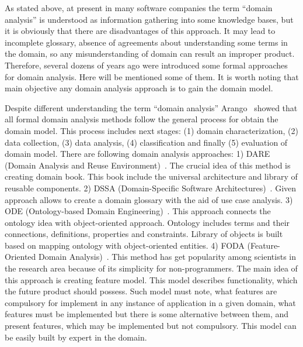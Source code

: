 \documentclass[conference]{IEEEtran}
\begin{document}
As stated above, at present in many software companies the term ``domain analysis'' is understood as information gathering into some knowledge bases, but it is obviously that there are disadvantages of this approach. It may lead to incomplete glossary, absence of agreements about understanding some terms in the domain, so any misunderstanding of domain can result an improper product. Therefore, several dozens of years ago were introduced some formal approaches for domain analysis. Here will be mentioned some of them. It is worth noting that main objective any domain analysis approach is to gain the domain model.  

Despite different understanding the term ``domain analysis'' Arango~\cite{arango1994domain} showed that all formal domain analysis methods follow the general process for obtain the domain model. This process includes next stages: (1) domain characterization, (2) data collection, (3) data analysis, (4) classification and finally (5) evaluation of domain model. There are following domain analysis approaches: 1) DARE (Domain Analysis and Reuse Environment)~\cite{frakes1998dare}. The crucial idea of this method is creating domain book. This book include the universal architecture and library of reusable components. 2) DSSA (Domain-Specific Software Architectures)~\cite{taylor1995software}. Given approach allows to create a domain glossary with the aid of use case analysis. 3) ODE (Ontology-based Domain Engineering)~\cite{falbo2002ontological}. This approach connects the ontology idea with object-oriented approach. Ontology includes  terms and their connections, definitions, properties and constraints. Library of objects is built based on mapping ontology with object-oriented entities. 4) FODA (Feature-Oriented Domain Analysis)~\cite{kang1990feature}. This method has get popularity among scientists in the research area because of its simplicity for non-programmers. The main idea of this approach is creating feature model. This model describes functionality, which the future product should possess. Such model must note, what features are compulsory for implement in any instance of application in a given domain, what features must be implemented but there is some alternative between them, and present features, which may be implemented but not compulsory. This model can be easily built by expert in the domain. 
\end{document}
